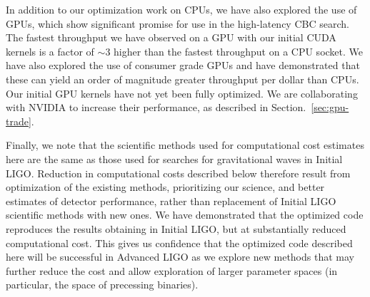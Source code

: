 In addition to our optimization work on CPUs, we have also explored the use of
GPUs, which show significant promise for use in the high-latency CBC search.
The fastest throughput we have observed on a GPU with our initial CUDA kernels
is a factor of $\sim 3$ higher than the fastest throughput on a CPU socket. We
have also explored the use of consumer grade GPUs and have demonstrated that
these can yield an order of magnitude greater throughput per dollar than CPUs. Our
initial GPU kernels have not yet been fully optimized. We 
are collaborating with NVIDIA to increase their performance, as
described in Section.~\ref{sec:gpu-trade}.

Finally, we note that the scientific methods used for computational cost estimates
here are the same as those used for searches for gravitational waves
in Initial LIGO.  Reduction in computational costs described below therefore
result from optimization of the existing methods, prioritizing our science,
and better estimates of detector performance, rather than replacement of
Initial LIGO scientific methods with new ones. We have demonstrated that the
optimized code reproduces the results obtaining in Initial LIGO, but at
substantially reduced computational cost. This gives us confidence that the
optimized code described here will be successful in Advanced LIGO as we
explore new methods that may further reduce the cost and allow exploration of
larger parameter spaces (in particular, the space of precessing binaries).

